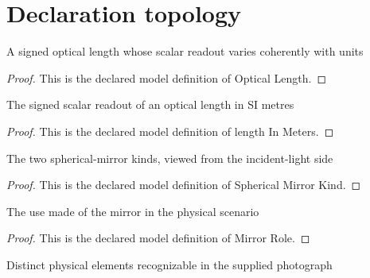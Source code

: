 \section{Declaration topology}
\begin{definition}
  \label{def:physics:phyx-mini-0139:phyxminiproblems-problemphyxmini0139-opticallength}
  A signed optical length whose scalar readout varies coherently with units
\end{definition}
\begin{proof}
  This is the declared model definition of Optical Length.
\end{proof}
\begin{definition}
  \label{def:physics:phyx-mini-0139:phyxminiproblems-problemphyxmini0139-lengthinmeters}
  The signed scalar readout of an optical length in SI metres
\end{definition}
\begin{proof}
  This is the declared model definition of length In Meters.
\end{proof}
\begin{definition}
  \label{def:physics:phyx-mini-0139:phyxminiproblems-problemphyxmini0139-sphericalmirrorkind}
  The two spherical-mirror kinds, viewed from the incident-light side
\end{definition}
\begin{proof}
  This is the declared model definition of Spherical Mirror Kind.
\end{proof}
\begin{definition}
  \label{def:physics:phyx-mini-0139:phyxminiproblems-problemphyxmini0139-mirrorrole}
  The use made of the mirror in the physical scenario
\end{definition}
\begin{proof}
  This is the declared model definition of Mirror Role.
\end{proof}
\begin{definition}
  \label{def:physics:phyx-mini-0139:phyxminiproblems-problemphyxmini0139-figureelement}
  Distinct physical elements recognizable in the supplied photograph
\end{definition}
